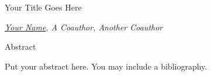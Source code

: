 \documentclass[11pt]{article}
\begin{document}


\begin{center} \Large
Your Title Goes Here
\end{center}


\begin{center} \em
\underline{Your Name}, A Coauthor, Another Coauthor
\end{center}


\centerline{Abstract}
\medskip

Put your abstract here.  You may include a bibliography.
\end{document}
